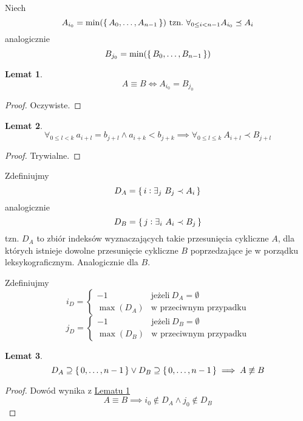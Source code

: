 \documentclass{scrartcl}
\theoremstyle{definition}
\theoremstyle{plain}
\theoremstyle{remark}
\theoremstyle{plain}
\newtheorem{lemma_equiv_if_lex_min_eq}{Lemat}[section]
\newtheorem{lemma_k_shift_greater}
[lemma_equiv_if_lex_min_eq]{Lemat}
\newtheorem{lemma_1_n_in_d_no_equiv}
[lemma_equiv_if_lex_min_eq]{Lemat}
\theoremstyle{definition}
\theoremstyle{plain}
\begin{document}
Niech
\[A_{i_0}=\min(\set{A_0,\dots,A_{n-1}})
	\ \text{tzn.}\ \forall_{0\le i<n-1}A_{i_0}\preceq A_i\]
analogicznie
\[B_{j_0}=\min(\set{B_0,\dots,B_{n-1}})\]
\begin{lemma_equiv_if_lex_min_eq}
	\label{lem:equivalence_if_lex_min_eq}
	\[A\equiv B \iff A_{i_0}=B_{j_0}\]
\end{lemma_equiv_if_lex_min_eq}
\begin{proof}
	Oczywiste.
\end{proof}
\begin{lemma_k_shift_greater}
	\label{lem:k_shift_greater}
	\[\forall_{0\le l<k}\ a_{i+l}=b_{j+l} \land a_{i+k}<b_{j+k}
		\implies \forall_{0\le l\le k}\ A_{i+l}\prec B_{j+l}\]
\end{lemma_k_shift_greater}
\begin{proof}
	Trywialne.
\end{proof}
Zdefiniujmy
\[D_A=\set{i:\exists_j\ B_j\prec A_i}\]
analogicznie
\[D_B=\set{j:\exists_i\ A_i\prec B_j}\]
tzn. \(D_A\) to zbiór indeksów
wyznaczających takie przesunięcia cykliczne \(A\),
dla których istnieje dowolne przesunięcie cykliczne \(B\)
poprzedzające je w porządku leksykograficznym.
Analogicznie dla \(B\).
\pagebreak

Zdefiniujmy
\[i_D=\begin{cases}
		-1        & \text{jeżeli}\ D_A=\emptyset  \\
		\max(D_A) & \text{w przeciwnym przypadku}
	\end{cases}\]
\[j_D=\begin{cases}
		-1        & \text{jeżeli}\ D_B=\emptyset  \\
		\max(D_B) & \text{w przeciwnym przypadku}
	\end{cases}\]
\begin{lemma_1_n_in_d_no_equiv}
	\label{lem:1_n_in_d_no_equiv}
	\[D_A\supseteq\set{0,\dots,n-1}\lor
		D_B\supseteq\set{0,\dots,n-1}
		\implies A\not\equiv B\]
\end{lemma_1_n_in_d_no_equiv}
\begin{proof}
	Dowód wynika z
	\hyperref[lem:equivalence_if_lex_min_eq]
	{Lematu \ref*{lem:equivalence_if_lex_min_eq}}
	\[A\equiv B\implies i_0\notin D_A \land j_0\notin D_B\]
\end{proof}
\end{document}
